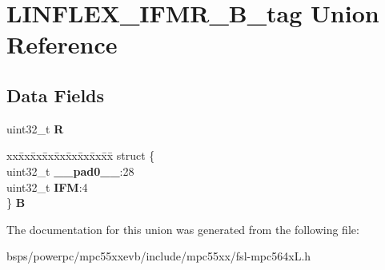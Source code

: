 \hypertarget{unionLINFLEX__IFMR__32B__tag}{}\section{L\+I\+N\+F\+L\+E\+X\+\_\+\+I\+F\+M\+R\+\_\+B\+\_\+tag Union Reference}
\label{unionLINFLEX__IFMR__32B__tag}
\subsection*{Data Fields}
\begin{DoxyCompactItemize}
\item 
\mbox{\label{unionLINFLEX__IFMR__32B__tag_a81aa693865c8e831b68e3c7c69ce3ea1}} 
uint32\+\_\+t {\bfseries R}
\item 
\mbox{\label{unionLINFLEX__IFMR__32B__tag_a59b3bcb26f7216c75f660a273d6f21f4}} 
\begin{tabbing}
xx\=xx\=xx\=xx\=xx\=xx\=xx\=xx\=xx\=\kill
struct \{\\
\>uint32\_t {\bfseries \_\_pad0\_\_}:28\\
\>uint32\_t {\bfseries IFM}:4\\
\} {\bfseries B}\\

\end{tabbing}\end{DoxyCompactItemize}


The documentation for this union was generated from the following file\+:\begin{DoxyCompactItemize}
\item 
bsps/powerpc/mpc55xxevb/include/mpc55xx/fsl-\/mpc564x\+L.\+h\end{DoxyCompactItemize}
